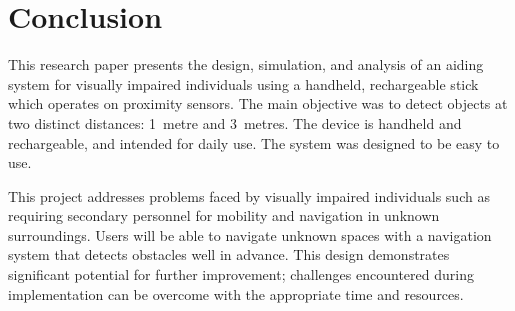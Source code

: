 \documentclass[12pt, a4paper]{article}
\begin{document}
\section*{Conclusion}

This research paper presents the design, simulation, and analysis of an aiding system for visually
impaired individuals using a handheld, rechargeable stick which operates on proximity sensors. The
main objective was to detect objects at two distinct distances: 1~metre and 3~metres. The device is
handheld and rechargeable, and intended for daily use. The system was designed to be easy to use.

This project addresses problems faced by visually impaired individuals such as requiring secondary
personnel for mobility and navigation in unknown surroundings. Users will be able to navigate unknown
spaces with a navigation system that detects obstacles well in advance. This design demonstrates
significant potential for further improvement; challenges encountered during implementation can be
overcome with the appropriate time and resources.



\end{document}
